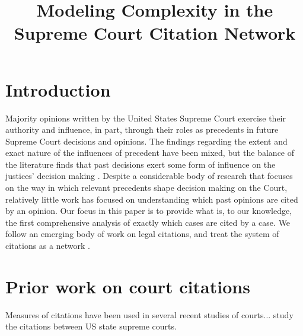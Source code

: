 \documentclass[headsepline=true, abstracton]{scrartcl}
\begin{document}
\renewcommand{\refname}{Bibliography}


\onehalfspacing
\setlength{\headsep}{15mm}


\thispagestyle{plain}

\title{\Large Modeling Complexity in the \\ Supreme Court Citation Network}
\maketitle

\begin{abstract}
\noindent 
\end{abstract}


 \section{Introduction}
 
 
 
 
Majority opinions written by the United States Supreme Court exercise their authority and influence, in part, through their roles as precedents in future Supreme Court decisions and opinions. The findings regarding the extent and exact nature of the influences of precedent have been mixed, but the balance of the literature finds that past decisions exert some form of influence on the justices' decision making \citep{knight1996norm,gillman2001s,richards2002jurisprudential,hansford2006politics,bailey2008does,bailey2011constrained}. Despite a considerable body of research that focuses on the way in which relevant precedents shape decision making on the Court, relatively little work has focused on understanding which past opinions are cited by an opinion. Our focus in this paper is to provide what is, to our knowledge, the first comprehensive analysis of exactly which cases are cited by a case. We follow an emerging body of work on legal citations, and treat the system of citations as a network \citep[e.g., ][]{fowler2007network, fowler2008authority,bommarito2009law,lupu2012precedent,pelc2014politics}. 



\section{Prior work on court citations}

Measures of citations have been used in several recent studies of courts...\citet{hinkle2016transmission} study the citations between US state supreme courts.
\end{document}
